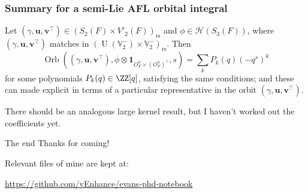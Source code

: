 \documentclass[11pt]{beamer}
\DeclareMathOperator{\Orb}{Orb}
\DeclareMathOperator{\U}{U}
\newcommand{\HH}{\mathcal{H}}
\newcommand{\VV}{\mathbb{V}}
\renewcommand{\OO}{O}
\newcommand{\guv}{{(\gamma, \uu, \vv^\top)}}
\newcommand{\oneV}{\mathbf{1}_{\OO_F^n \times (\OO_F^n)^\vee}}
\newcommand{\rs}{_{\text{rs}}}
\newcommand{\uu}{\mathbf{u}}
\newcommand{\vv}{\mathbf{v}}
\begin{document}
\begin{frame}
  \frametitle{Summary for a semi-Lie AFL orbital integral}
  \begin{theorem}[C.]
    Let $\guv \in (S_2(F) \times V'_2(F))\rs$ and $\phi \in \HH(S_3(F))$,
    where $\guv$ matches in $(\U(\VV_2^-) \times \VV_2^-)\rs$.
    Then
    \[ \Orb(\guv, \phi \otimes \oneV, s) = \sum_k P_k(q) (-q^s)^k \]
    for some polynomials $P_k(q) \in \ZZ[q]$, satisfying the same conditions;
    and these can made explicit in terms of a particular representative in the orbit $\guv$.
  \end{theorem}
  There should be an analogous large kernel result,
  but I haven't worked out the coefficients yet.
\end{frame}

\begin{frame}
  \begin{block}{The end}
    Thanks for coming!
  \end{block}

  Relevant files of mine are kept at:
  \begin{itemize}
    \ii \url{https://github.com/vEnhance/evans-phd-notebook}
  \end{itemize}
\end{frame}
\end{document}
